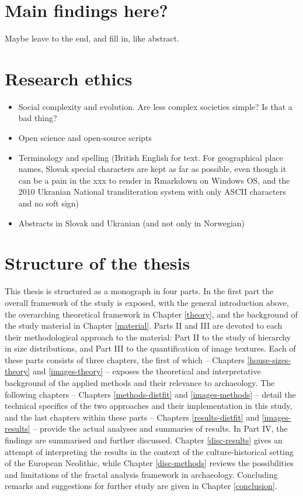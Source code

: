 \documentclass[
  12pt,
  a4paper, twoside]{book}
\begin{document}
\hypertarget{main-findings-here}{%
\section{Main findings here?}\label{main-findings-here}}

Maybe leave to the end, and fill in, like abstract.

\hypertarget{research-ethics}{%
\section{Research ethics}\label{research-ethics}}

\begin{itemize}
\item
  Social complexity and evolution. Are less complex societies simple? Is that a bad thing?
\item
  Open science and open-source scripts
\item
  Terminology and spelling (British English for text. For geographical place names, Slovak special characters are kept as far as possible, even though it can be a pain in the xxx to render in Rmarkdown on Windows OS, and the 2010 Ukranian National transliteration system with only ASCII characters and no soft sign)
\item
  Abstracts in Slovak and Ukranian (and not only in Norwegian)
\end{itemize}

\hypertarget{structure-of-the-thesis}{%
\section{Structure of the thesis}\label{structure-of-the-thesis}}

This thesis is structured as a monograph in four parts. In the first part the overall framework of the study is exposed, with the general introduction above, the overarching theoretical framework in Chapter \ref{theory}, and the background of the study material in Chapter \ref{material}. Parts II and III are devoted to each their methodological approach to the material: Part II to the study of hierarchy in size distributions, and Part III to the quantification of image textures. Each of these parts consists of three chapters, the first of which -- Chapters \ref{house-sizes-theory} and \ref{images-theory} -- exposes the theoretical and interpretative background of the applied methods and their relevance to archaeology. The following chapters -- Chapters \ref{methods-distfit} and \ref{images-methods} -- detail the technical specifics of the two approaches and their implementation in this study, and the last chapters within these parts -- Chapters \ref{results-distfit} and \ref{images-results} -- provide the actual analyses and summaries of results. In Part IV, the findings are summarised and further discussed. Chapter \ref{disc-results} gives an attempt of interpreting the results in the context of the culture-historical setting of the European Neolithic, while Chapter \ref{disc-methods} reviews the possibilities and limitations of the fractal analysis framework in archaeology. Concluding remarks and suggestions for further study are given in Chapter \ref{conclusion}.
\end{document}
